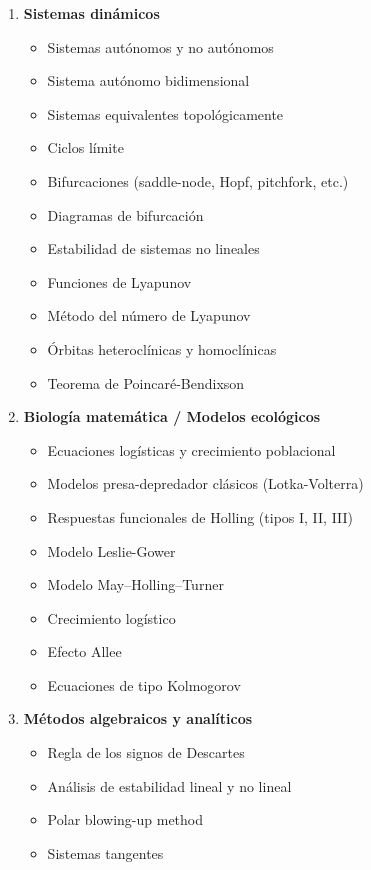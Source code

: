\begin{enumerate}
    	\item \textbf{Sistemas dinámicos}
    	\begin{itemize}
    		\item Sistemas autónomos y no autónomos
    		\item Sistema autónomo bidimensional
    		\item Sistemas equivalentes topológicamente
    		\item Ciclos límite
    		\item Bifurcaciones (saddle-node, Hopf, pitchfork, etc.)
    		\item Diagramas de bifurcación
    		\item Estabilidad de sistemas no lineales
    		\item Funciones de Lyapunov
    		\item Método del número de Lyapunov
    		\item Órbitas heteroclínicas y homoclínicas
    		\item Teorema de Poincaré-Bendixson
    	\end{itemize}
    	
    	\item \textbf{Biología matemática / Modelos ecológicos}
    	\begin{itemize}
    		\item Ecuaciones logísticas y crecimiento poblacional
    		\item Modelos presa-depredador clásicos (Lotka-Volterra)
    		\item Respuestas funcionales de Holling (tipos I, II, III)
    		\item Modelo Leslie-Gower
    		\item Modelo May–Holling–Turner
    		\item Crecimiento logístico
    		\item Efecto Allee
    		\item Ecuaciones de tipo Kolmogorov
    	\end{itemize}
    	
    	\item \textbf{Métodos algebraicos y analíticos}
    	\begin{itemize}
    		\item Regla de los signos de Descartes
    		\item Análisis de estabilidad lineal y no lineal
    		\item Polar blowing-up method
    		\item Sistemas tangentes
    	\end{itemize}
    \end{enumerate}
   
